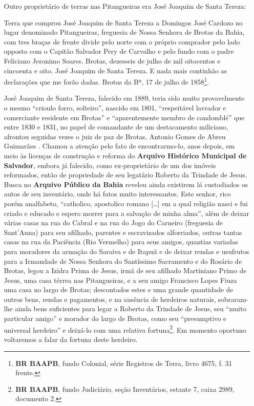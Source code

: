 Outro proprietário de terras nas Pitangueiras era José Joaquim de Santa Tereza:

\begin{citacao}
Terra que comprou José Joaquim de Santa Tereza a Domingos José Cardozo no lugar denominado Pitangueiras, freguesia de Nossa Senhora de Brotas da Bahia, com tres braças de frente divide pelo norte com o próprio comprador pelo lado opposto com o Capitão Salvador Pery de Carvalho e pelo fundo com o padre Feliciano Jeronimo Soares. Brotas, dezesseis de julho de mil oitocentos e cincoenta e oito. José Joaquim de Santa Tereza. E nada mais continhão as declarações que me forão dadas. Brotas da Bª, 17 de julho de 1858\footnote{\textbf{BR BAAPB}, fundo Colonial, série Registros de Terra, livro 4675, f. 31 frente.}.
\end{citacao}

José Joaquim de Santa Tereza, falecido em 1889, teria sido muito provavelmente o mesmo ``crioulo forro, solteiro'', nascido em 1801, ``respeitável lavrador e comerciante residente em Brotas'' e ``aparentemente membro de candomblé'' que entre 1830 e 1831, no papel de comandante de um destacamento miliciano, afrontou seguidas vezes o juiz de paz de Brotas, Antonio Gomes de Abreu Guimarães \cite[pp.~54-59]{REISSILVA1989}. Chamou a atenção pelo fato de encontrarmo-lo, anos depois, em meio às licenças de construção e reforma do \textbf{Arquivo Histórico Municipal de Salvador}, embora já falecido, como ex-proprietário de um dos imóveis reformados, então de propriedade de seu legatário Roberto da Trindade de Jesus. Busca no \textbf{Arquivo Público da Bahia} revelou ainda existirem lá custodiados os autos de seu inventário, onde há fatos muito interessantes. Este senhor, rico porém analfabeto, ``catholico, apostolico romano [\dots] em a qual religião nasci e fui criado e educado e espero morrer para a salvação de minha alma'', além de deixar várias casas na rua do Cabral e na rua do Jogo do Carneiro (freguesia de Sant'Anna) para seu afilhado, parentes e escravizados alforriados, outras tantas casas na rua da Paciência (Rio Vermelho) para seus amigos, quantias variadas para moradores da armação do Saraiva e de Itapuã e de deixar rendas e usufrutos para a Irmandade de Nossa Senhora do Santíssimo Sacramento e do Rosário de Brotas, legou a Izidra Prima de Jesus, irmã de seu afilhado Martiniano Primo de Jesus, uma casa térrea nas Pitangueiras, e a seu amigo Francisco Lopes Fiuza uma casa no largo de Brotas; descontados estes e uma grande quantidade de outros bens, rendas e pagamentos, e na ausência de herdeiros naturais, sobraram-lhe ainda bens suficientes para legar a Roberto da Trindade de Jesus, seu ``muito particular amigo'' e morador do largo de Brotas, como seu ``presumptivo e universal herdeiro'' e deixá-lo com uma relativa fortuna\footnote{\textbf{BR BAAPB}, fundo Judiciário, seção Inventários, estante 7, caixa 2989, documento 2.}. Em momento oportuno voltaremos a falar da fortuna deste herdeiro. 

